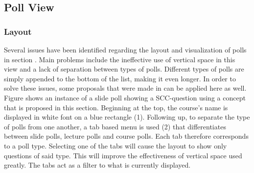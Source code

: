 \subsection{Poll View}

\subsubsection{Layout}
Several issues have been identified regarding the layout and visualization of polls in section \todosct. Main problems include the ineffective use of vertical space in this view and a lack of separation between types of polls. Different types of polls are simply appended to the bottom of the list, making it even longer. In order to solve these issues, some proposals that were made in \todosct can be applied here as well.  Figure \todosct shows an instance of a slide poll showing a SCC-question using a concept that is proposed in this section.
Beginning at the top, the course's name is displayed in white font on a blue rectangle (1). Following up, to separate the type of polls from one another, a tab based menu is used (2) that differentiates between slide polls, lecture polls and course polls. Each tab therefore corresponds to a poll type. Selecting one of the tabs will cause the layout to show only questions of said type. This will improve the effectiveness of vertical space used greatly. The tabs act as a filter to what is currently displayed.

